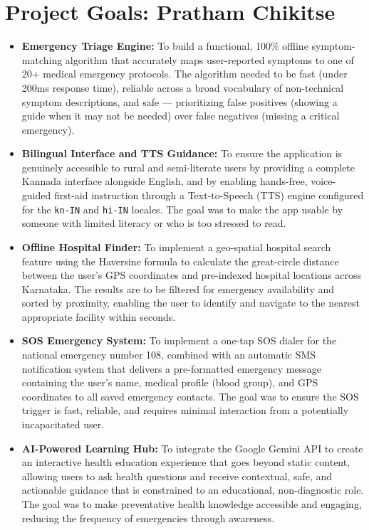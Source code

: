 \documentclass[12pt,a4paper]{report}
\begin{document}
\section{Project Goals: Pratham Chikitse}

\begin{itemize}
    \item \textbf{Emergency Triage Engine:} To build a functional, 100\% offline symptom-matching algorithm that accurately maps user-reported symptoms to one of 20+ medical emergency protocols. The algorithm needed to be fast (under 200ms response time), reliable across a broad vocabulary of non-technical symptom descriptions, and safe — prioritizing false positives (showing a guide when it may not be needed) over false negatives (missing a critical emergency).

    \item \textbf{Bilingual Interface and TTS Guidance:} To ensure the application is genuinely accessible to rural and semi-literate users by providing a complete Kannada interface alongside English, and by enabling hands-free, voice-guided first-aid instruction through a Text-to-Speech (TTS) engine configured for the \texttt{kn-IN} and \texttt{hi-IN} locales. The goal was to make the app usable by someone with limited literacy or who is too stressed to read.

    \item \textbf{Offline Hospital Finder:} To implement a geo-spatial hospital search feature using the Haversine formula to calculate the great-circle distance between the user's GPS coordinates and pre-indexed hospital locations across Karnataka. The results are to be filtered for emergency availability and sorted by proximity, enabling the user to identify and navigate to the nearest appropriate facility within seconds.

    \item \textbf{SOS Emergency System:} To implement a one-tap SOS dialer for the national emergency number 108, combined with an automatic SMS notification system that delivers a pre-formatted emergency message containing the user's name, medical profile (blood group), and GPS coordinates to all saved emergency contacts. The goal was to ensure the SOS trigger is fast, reliable, and requires minimal interaction from a potentially incapacitated user.

    \item \textbf{AI-Powered Learning Hub:} To integrate the Google Gemini API to create an interactive health education experience that goes beyond static content, allowing users to ask health questions and receive contextual, safe, and actionable guidance that is constrained to an educational, non-diagnostic role. The goal was to make preventative health knowledge accessible and engaging, reducing the frequency of emergencies through awareness.
\end{itemize}
\end{document}
